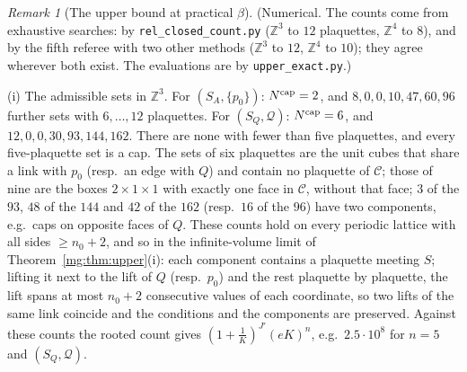 \documentclass[11pt,a4paper]{article}
\theoremstyle{definition}
\theoremstyle{remark}
\newtheorem{remark}[theorem]{Remark}
\newcommand{\Z}{\mathbb{Z}}
\begin{document}
\begin{remark}[The upper bound at practical $\beta$]\label{mg:rem:upperexact}
(Numerical. The counts come from exhaustive searches: by \texttt{rel\_closed\_count.py} ($\Z^3$ to $12$ plaquettes, $\Z^4$ to $8$), and by the fifth referee with two other
methods ($\Z^3$ to $12$, $\Z^4$ to $10$); they agree wherever both exist. The evaluations are by \texttt{upper\_exact.py}.)

(i) The admissible sets in $\Z^3$. For $(S_A,\{p_0\})$: $N^{\rm cap}=2$, and $8,0,0,10,47,60,96$ further sets with $6,\dots,12$ plaquettes. For $(S_Q,\mathcal Q)$: $N^{\rm cap}=6$,
and $12,0,0,30,93,144,162$. There are none with fewer than five plaquettes, and every five-plaquette set is a cap. The sets of six plaquettes are the unit cubes that share a
link with $p_0$ (resp.\ an edge with $Q$) and contain no plaquette of $\mathcal C$; those of nine are the boxes $2\times1\times1$ with exactly one face in $\mathcal C$, without that face;
$3$ of the $93$, $48$ of the $144$ and $42$ of the $162$ (resp.\ $16$ of the $96$) have two components, e.g.\ caps on opposite faces of $Q$. These counts hold on every periodic
lattice with all sides $\ge n_0+2$, and so in the infinite-volume limit of Theorem~\ref{mg:thm:upper}(i): each component contains a plaquette meeting $S$; lifting it next to the lift of
$Q$ (resp.\ $p_0$) and the rest plaquette by plaquette, the lift spans at most $n_0+2$ consecutive values of each coordinate, so two lifts of the same link coincide and the
conditions and the components are preserved. Against these counts the rooted count gives $(1+\frac1K)^{J'}(eK)^n$, e.g.\ $2.5\cdot10^8$ for $n=5$ and $(S_Q,\mathcal Q)$.


\end{remark}
\end{document}
